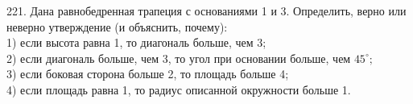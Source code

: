 221. Дана равнобедренная трапеция с основаниями 1 и 3. Определить, верно или неверно утверждение (и объяснить, почему):\\
1) если высота равна 1, то диагональ больше, чем 3;\\
2) если диагональ больше, чем 3, то угол при основании больше, чем $45^\circ;$\\
3) если боковая сторона больше 2, то площадь больше 4;\\
4) если площадь равна 1, то радиус описанной окружности больше 1.\\

